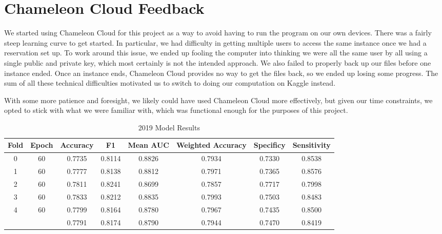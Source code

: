 \documentclass{article}
\begin{document}
\section{Chameleon Cloud Feedback}

We started using Chameleon Cloud for this project as a way to avoid having to run the program on our own devices. There was a fairly steep learning curve to get started. In particular, we had difficulty in getting multiple users to access the same instance once we had a reservation set up. To work around this issue, we ended up fooling the computer into thinking we were all the same user by all using a single public and private key, which most certainly is not the intended approach. We also failed to properly back up our files before one instance ended. Once an instance ends, Chameleon Cloud provides no way to get the files back, so we ended up losing some progress. The sum of all these technical difficulties motivated us to switch to doing our computation on Kaggle instead.

With some more patience and foresight, we likely could have used Chameleon Cloud more effectively, but given our time constraints, we opted to stick with what we were familiar with, which was functional enough for the purposes of this project.

\begin{table}[t]
    \caption{2019 Model Results}
    \label{2019table}
    \vskip 0.15in
    \begin{center}
    \begin{small}
    \begin{sc}
    \begin{tabular*}{\linewidth}{@{\extracolsep{\fill}} cccccccc}
    \toprule
    Fold & Epoch & Accuracy & F1 & Mean AUC & Weighted Accuracy & Specificy & Sensitivity \\
    \midrule
    0 & 60 & 0.7735 & 0.8114 & 0.8826 & 0.7934 & 0.7330 & 0.8538 \\
    1 & 60 & 0.7777 & 0.8138 & 0.8812 & 0.7971 & 0.7365 & 0.8576 \\
    2 & 60 & 0.7811 & 0.8241 & 0.8699 & 0.7857 & 0.7717 & 0.7998 \\
    3 & 60 & 0.7833 & 0.8212 & 0.8835 & 0.7993 & 0.7503 & 0.8483 \\
    4 & 60 & 0.7799 & 0.8164 & 0.8780 & 0.7967 & 0.7435 & 0.8500 \\
    \midrule
    &    & 0.7791 & 0.8174 & 0.8790 & 0.7944 & 0.7470 & 0.8419 \\
    \bottomrule
    \end{tabular*}
    \end{sc}
    \end{small}
    \end{center}
    \vskip -0.1in
\end{table}
\end{document}
